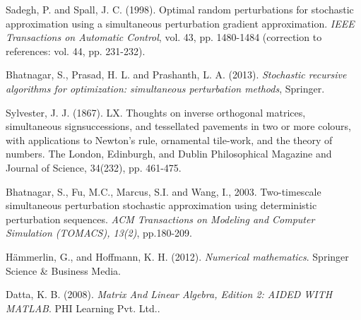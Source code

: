 \documentclass[conference,10.3cpt]{IEEEtran}
\newcommand{\remove}[1]{}
\begin{document}
\begin{thebibliography}{1}
\remove {	\bibitem{Bar-Itzhack1998} Bar-Itzhack,
	I.Y. (1998). Matrix symmetrization. \textit{Journal of guidance,
		control, and dynamics}, 21(1), 178-179.	}


 Sadegh, P. and Spall,
  J. C. (1998). Optimal random perturbations for stochastic
  approximation using a simultaneous perturbation gradient
  approximation. \textit{IEEE Transactions on Automatic Control}, vol. 43, pp. 1480-1484 (correction to references: vol. 44, pp. 231-232).

\remove {\bibitem{Cao2011}
Cao, X. (2011, March). Effective perturbation distributions for small samples in simultaneous perturbation stochastic approximation. In \textit{2011 45th Annual Conference on Information Sciences and Systems} (pp. 1-5). IEEE.}


 Bhatnagar, S., Prasad,
  H. L. and Prashanth, L. A. (2013). \textit{Stochastic recursive
    algorithms for optimization: simultaneous perturbation methods},
  Springer.

 Sylvester,
  J. J. (1867). LX. Thoughts on inverse orthogonal matrices,
  simultaneous signsuccessions, and tessellated pavements in two or more
  colours, with applications to Newton's rule, ornamental tile-work, and
  the theory of numbers. The London, Edinburgh, and Dublin Philosophical
  Magazine and Journal of Science, 34(232), pp. 461-475.

Bhatnagar, S., Fu, M.C., Marcus, S.I. and Wang, I., 2003. Two-timescale simultaneous perturbation stochastic approximation using deterministic perturbation sequences. \textit{ACM Transactions on Modeling and Computer Simulation (TOMACS), 13(2)}, pp.180-209.

H{\"a}mmerlin, G., and Hoffmann, K. H. (2012). \textit{Numerical mathematics}. Springer Science \& Business Media.

Datta, K. B. (2008). \textit{Matrix And Linear Algebra, Edition 2: AIDED WITH MATLAB}. PHI Learning Pvt. Ltd..

\end{thebibliography}
\end{document}
